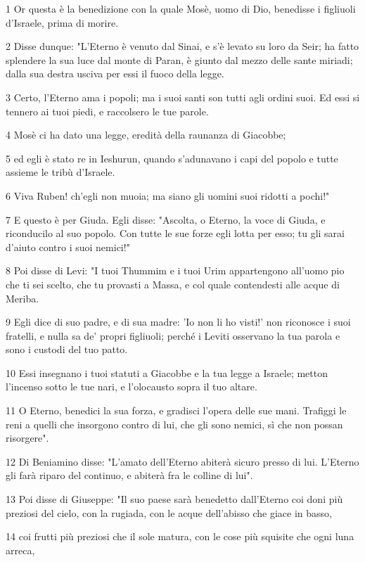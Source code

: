 \par 1 Or questa è la benedizione con la quale Mosè, uomo di Dio, benedisse i figliuoli d'Israele, prima di morire.
\par 2 Disse dunque: "L'Eterno è venuto dal Sinai, e s'è levato su loro da Seir; ha fatto splendere la sua luce dal monte di Paran, è giunto dal mezzo delle sante miriadi; dalla sua destra usciva per essi il fuoco della legge.
\par 3 Certo, l'Eterno ama i popoli; ma i suoi santi son tutti agli ordini suoi. Ed essi si tennero ai tuoi piedi, e raccolsero le tue parole.
\par 4 Mosè ci ha dato una legge, eredità della raunanza di Giacobbe;
\par 5 ed egli è stato re in Ieshurun, quando s'adunavano i capi del popolo e tutte assieme le tribù d'Israele.
\par 6 Viva Ruben! ch'egli non muoia; ma siano gli uomini suoi ridotti a pochi!"
\par 7 E questo è per Giuda. Egli disse: "Ascolta, o Eterno, la voce di Giuda, e riconducilo al suo popolo. Con tutte le sue forze egli lotta per esso; tu gli sarai d'aiuto contro i suoi nemici!"
\par 8 Poi disse di Levi: "I tuoi Thummim e i tuoi Urim appartengono all'uomo pio che ti sei scelto, che tu provasti a Massa, e col quale contendesti alle acque di Meriba.
\par 9 Egli dice di suo padre, e di sua madre: 'Io non li ho visti!' non riconosce i suoi fratelli, e nulla sa de' propri figliuoli; perché i Leviti osservano la tua parola e sono i custodi del tuo patto.
\par 10 Essi insegnano i tuoi statuti a Giacobbe e la tua legge a Israele; metton l'incenso sotto le tue nari, e l'olocausto sopra il tuo altare.
\par 11 O Eterno, benedici la sua forza, e gradisci l'opera delle sue mani. Trafiggi le reni a quelli che insorgono contro di lui, che gli sono nemici, sì che non possan risorgere".
\par 12 Di Beniamino disse: "L'amato dell'Eterno abiterà sicuro presso di lui. L'Eterno gli farà riparo del continuo, e abiterà fra le colline di lui".
\par 13 Poi disse di Giuseppe: "Il suo paese sarà benedetto dall'Eterno coi doni più preziosi del cielo, con la rugiada, con le acque dell'abisso che giace in basso,
\par 14 coi frutti più preziosi che il sole matura, con le cose più squisite che ogni luna arreca,
